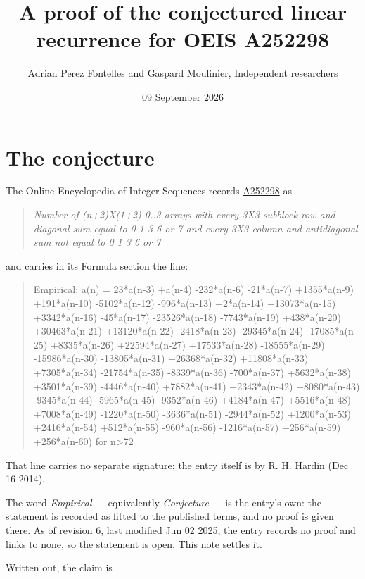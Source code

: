\documentclass[11pt]{article}
\title{A proof of the conjectured linear recurrence for OEIS A252298}
\author{Adrian Perez Fontelles and Gaspard Moulinier, Independent researchers}
\date{09 September 2026}
\theoremstyle{definition}
\begin{document}
\maketitle
\section{The conjecture}

The Online Encyclopedia of Integer Sequences records \href{https://oeis.org/A252298}{A252298} as

\begin{quote}\itshape Number of (n+2)X(1+2) 0..3 arrays with every 3X3 subblock row and diagonal sum equal to 0 1 3 6 or 7 and every 3X3 column and antidiagonal sum not equal to 0 1 3 6 or 7\end{quote}

and carries in its Formula section the line:

\begin{quote}\ttfamily Empirical: a(n) = 23*a(n-3) +a(n-4) -232*a(n-6) -21*a(n-7) +1355*a(n-9) +191*a(n-10) -5102*a(n-12) -996*a(n-13) +2*a(n-14) +13073*a(n-15) +3342*a(n-16) -45*a(n-17) -23526*a(n-18) -7743*a(n-19) +438*a(n-20) +30463*a(n-21) +13120*a(n-22) -2418*a(n-23) -29345*a(n-24) -17085*a(n-25) +8335*a(n-26) +22594*a(n-27) +17533*a(n-28) -18555*a(n-29) -15986*a(n-30) -13805*a(n-31) +26368*a(n-32) +11808*a(n-33) +7305*a(n-34) -21754*a(n-35) -8339*a(n-36) -700*a(n-37) +5632*a(n-38) +3501*a(n-39) -4446*a(n-40) +7882*a(n-41) +2343*a(n-42) +8080*a(n-43) -9345*a(n-44) -5965*a(n-45) -9352*a(n-46) +4184*a(n-47) +5516*a(n-48) +7008*a(n-49) -1220*a(n-50) -3636*a(n-51) -2944*a(n-52) +1200*a(n-53) +2416*a(n-54) +512*a(n-55) -960*a(n-56) -1216*a(n-57) +256*a(n-59) +256*a(n-60) for n>72\end{quote}

That line carries no separate signature; the entry itself is by R. H. Hardin (Dec 16 2014).

The word {\itshape Empirical} --- equivalently {\itshape Conjecture} --- is the entry's own: the statement is recorded as fitted to the published terms, and no proof is given there. As of revision 6, last modified Jun 02 2025, the entry records no proof and links to none, so the statement is open. This note settles it.

Written out, the claim is
\end{document}
